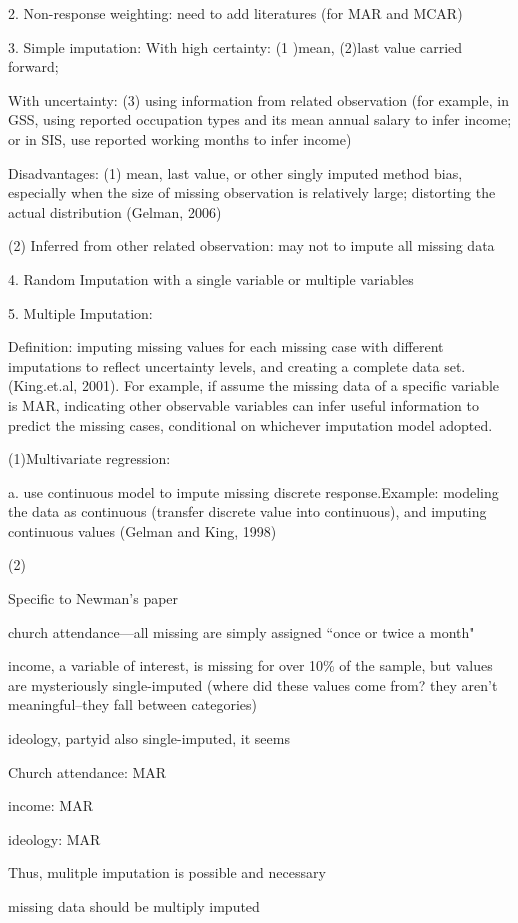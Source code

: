 2. Non-response weighting: need to add literatures (for MAR and MCAR)\par

3. Simple imputation: With high certainty: (1 )mean, (2)last value carried forward;\par

With uncertainty: (3) using information from related observation (for example, in GSS, using reported occupation types and its mean annual salary to infer income; or in SIS, use reported working months to infer income)\par
 
Disadvantages:  (1) mean, last value, or other singly imputed method bias, especially when the size of missing observation is relatively large; distorting the actual distribution (Gelman, 2006)\par

(2) Inferred from other related observation: may not to impute all missing data\par

4. Random Imputation with a single variable or multiple variables\par

5. Multiple Imputation:\par

Definition: imputing missing values for each missing case with different imputations to reflect uncertainty levels, and creating a complete data set. (King.et.al, 2001). For example, if assume the missing data of a specific variable is MAR, indicating other observable variables can infer useful information to predict the missing cases,  conditional on whichever imputation model adopted.\par

(1)Multivariate regression:\par
a. use continuous model to impute missing discrete response.Example: modeling the data as continuous (transfer discrete value into continuous), and imputing continuous values (Gelman and King, 1998) \par

(2)

Specific to Newman’s paper\par
church attendance---all missing are simply assigned ``once or twice a month"

income, a variable of interest, is missing for over 10\% of the sample, but values are mysteriously single-imputed (where did these values come from? they aren't meaningful--they fall between categories)

ideology, partyid also single-imputed, it seems

Church attendance: MAR

income: MAR

ideology: MAR

Thus, mulitple imputation is possible and necessary

missing data should be multiply imputed \citep[e.g.,][]{King2001}



